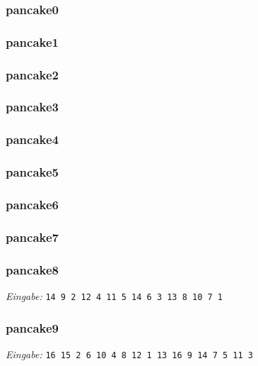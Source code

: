 \documentclass[a4paper, 10pt, ngerman]{article}
\begin{document}
\subsubsection{pancake0}


\subsubsection{pancake1}


\subsubsection{pancake2}


\subsubsection{pancake3}


\subsubsection{pancake4}


\subsubsection{pancake5}


\subsubsection{pancake6}


\subsubsection{pancake7}


\subsubsection{pancake8}
\scriptsize \emph{Eingabe:} \verb|14 9 2 12 4 11 5 14 6 3 13 8 10 7 1|
\normalsize


\subsubsection{pancake9}
\scriptsize \emph{Eingabe:} \verb|16 15 2 6 10 4 8 12 1 13 16 9 14 7 5 11 3|
\normalsize

\end{document}
